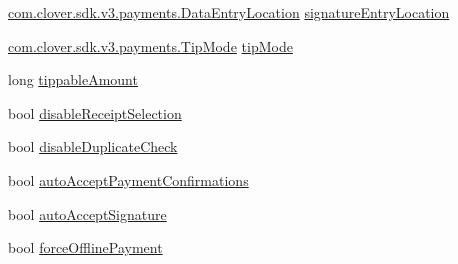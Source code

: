 \begin{DoxyCompactItemize}
\hyperlink{namespacecom_1_1clover_1_1sdk_1_1v3_1_1payments_ad57b15539defff23c13ea55aedf1c551}{com.\+clover.\+sdk.\+v3.\+payments.\+Data\+Entry\+Location} \hyperlink{classcom_1_1clover_1_1sdk_1_1v3_1_1payments_1_1_transaction_settings_a4241b44fea03e7f61814938e069a845b}{signature\+Entry\+Location}
\item 
\hyperlink{namespacecom_1_1clover_1_1sdk_1_1v3_1_1payments_a64910d0166e294f61d8b27b0d4ef26db}{com.\+clover.\+sdk.\+v3.\+payments.\+Tip\+Mode} \hyperlink{classcom_1_1clover_1_1sdk_1_1v3_1_1payments_1_1_transaction_settings_a21c1c184b6cb324b394fca0e2461e496}{tip\+Mode}
\item 
long \hyperlink{classcom_1_1clover_1_1sdk_1_1v3_1_1payments_1_1_transaction_settings_ab425a82336e4ce66d03c6162310cd14d}{tippable\+Amount}
\item 
bool \hyperlink{classcom_1_1clover_1_1sdk_1_1v3_1_1payments_1_1_transaction_settings_ade7e96b40b8a49eefbc21a5b417fc741}{disable\+Receipt\+Selection}
\item 
bool \hyperlink{classcom_1_1clover_1_1sdk_1_1v3_1_1payments_1_1_transaction_settings_a167b7e4aceb4f55df513512ba7033d60}{disable\+Duplicate\+Check}
\item 
bool \hyperlink{classcom_1_1clover_1_1sdk_1_1v3_1_1payments_1_1_transaction_settings_a4a6a920c8e7d23aee21f1ce0b3b7de32}{auto\+Accept\+Payment\+Confirmations}
\item 
bool \hyperlink{classcom_1_1clover_1_1sdk_1_1v3_1_1payments_1_1_transaction_settings_aa102df7c1ef2be3a8dd4494321ecc3fd}{auto\+Accept\+Signature}
\item 
bool \hyperlink{classcom_1_1clover_1_1sdk_1_1v3_1_1payments_1_1_transaction_settings_a925d2abe864c61aff01673a6d3316264}{force\+Offline\+Payment}
\end{DoxyCompactItemize}


